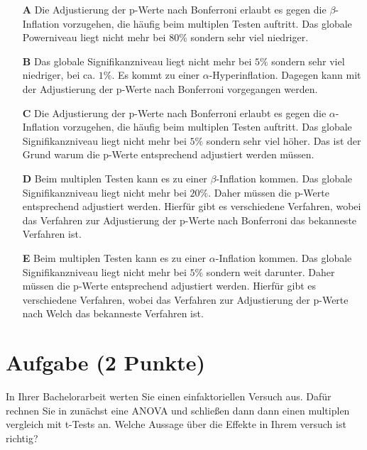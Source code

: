 \documentclass[a4paper, 9pt]{scrartcl}\usepackage[]{graphicx}\usepackage[]{xcolor}
\begin{document}
\begin{enumerate}
\item [\textbf{A} \msquare] Die Adjustierung der p-Werte nach Bonferroni erlaubt es gegen die $\beta$-Inflation vorzugehen, die häufig beim multiplen Testen auftritt. Das globale Powerniveau liegt nicht mehr bei $80\%$ sondern sehr viel niedriger.
\item [\textbf{B} \msquare] Das globale Signifikanzniveau liegt nicht mehr bei $5\%$ sondern sehr viel niedriger, bei ca. $1\%$. Es kommt zu einer $\alpha$-Hyperinflation. Dagegen kann mit der Adjustierung der p-Werte nach Bonferroni vorgegangen werden.
\item [\textbf{C} \msquare] Die Adjustierung der p-Werte nach Bonferroni erlaubt es gegen die $\alpha$-Inflation vorzugehen, die häufig beim multiplen Testen auftritt. Das globale Signifikanzniveau liegt nicht mehr bei $5\%$ sondern sehr viel höher. Das ist der Grund warum die p-Werte entsprechend adjustiert werden müssen.
\item [\textbf{D} \msquare] Beim multiplen Testen kann es zu einer $\beta$-Inflation kommen. Das globale Signifikanzniveau liegt nicht mehr bei $20\%$. Daher müssen die p-Werte entsprechend adjustiert werden. Hierfür gibt es verschiedene Verfahren, wobei das Verfahren zur Adjustierung der p-Werte nach Bonferroni das bekanneste Verfahren ist.
\item [\textbf{E} \msquare] Beim multiplen Testen kann es zu einer $\alpha$-Inflation kommen. Das globale Signifikanzniveau liegt nicht mehr bei $5\%$ sondern weit darunter. Daher müssen die p-Werte entsprechend adjustiert werden. Hierfür gibt es verschiedene Verfahren, wobei das Verfahren zur Adjustierung der p-Werte nach Welch das bekanneste Verfahren ist.
\end{enumerate}

\section{Aufgabe \hfill (2 Punkte)}




In Ihrer Bachelorarbeit werten Sie einen einfaktoriellen Versuch aus. Dafür rechnen Sie in \Rlogo zunächst eine ANOVA und schließen dann dann einen multiplen vergleich mit t-Tests an. Welche Aussage über die Effekte in Ihrem versuch ist richtig?
\end{document}
